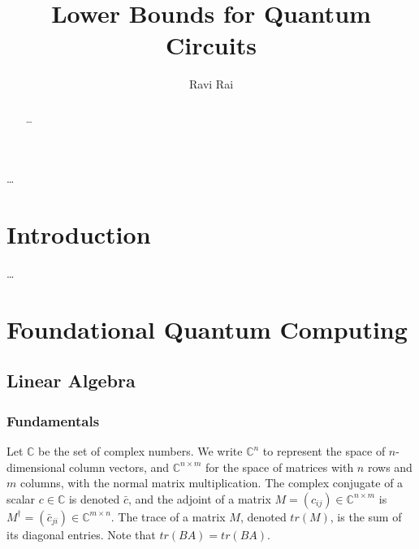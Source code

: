 \documentclass[12pt]{dalthesis}
\begin{document}
\title{Lower Bounds for Quantum Circuits}
\author{Ravi Rai}

\mcs  %




\dedicate{\ldots}

\nolistoftables
\nolistoffigures

\frontmatter

\begin{abstract}
\ldots
\end{abstract}

\begin{acknowledgements}
\ldots
\end{acknowledgements}

\mainmatter

\chapter{Introduction}

\ldots

\chapter{Foundational Quantum Computing}
\section{Linear Algebra}
\subsection{Fundamentals}
Let $\mathbb{C}$ be the set of complex numbers. We write $\mathbb{C}^n$ to represent the space of $n$-dimensional column vectors, and $\mathbb{C}^{n \times m}$ for the space of matrices with $n$ rows and $m$ columns, with the normal matrix multiplication. The complex conjugate of a scalar $c \in \mathbb{C}$ is denoted $\bar{c}$, and the adjoint of a matrix $M = (c_{ij}) \in \mathbb{C}^{n \times m}$ is $M^\dag = (\bar{c}_{ji}) \in \mathbb{C}^{m \times n}$. The trace of a matrix $M$, denoted $tr(M)$, is the sum of its diagonal entries. Note that $tr(BA) = tr(BA)$. 
\end{document}
